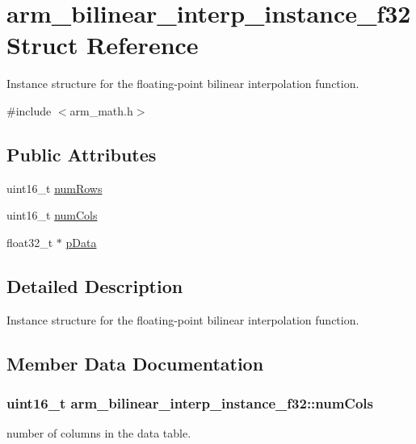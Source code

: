 \hypertarget{structarm__bilinear__interp__instance__f32}{}\section{arm\+\_\+bilinear\+\_\+interp\+\_\+instance\+\_\+f32 Struct Reference}
\label{structarm__bilinear__interp__instance__f32}


Instance structure for the floating-\/point bilinear interpolation function.  




{\ttfamily \#include $<$arm\+\_\+math.\+h$>$}

\subsection*{Public Attributes}
\begin{DoxyCompactItemize}
\item 
uint16\+\_\+t \hyperlink{structarm__bilinear__interp__instance__f32_a34f2b17cc57b95011960df9718af6ed6}{num\+Rows}
\item 
uint16\+\_\+t \hyperlink{structarm__bilinear__interp__instance__f32_aede17bebfb1f835b61d71dd813eab3f8}{num\+Cols}
\item 
float32\+\_\+t $\ast$ \hyperlink{structarm__bilinear__interp__instance__f32_afd1e764591c991c212d56c893efb5ea4}{p\+Data}
\end{DoxyCompactItemize}


\subsection{Detailed Description}
Instance structure for the floating-\/point bilinear interpolation function. 

\subsection{Member Data Documentation}
\subsubsection[{\texorpdfstring{num\+Cols}{numCols}}]{\setlength{\rightskip}{0pt plus 5cm}uint16\+\_\+t arm\+\_\+bilinear\+\_\+interp\+\_\+instance\+\_\+f32\+::num\+Cols}\hypertarget{structarm__bilinear__interp__instance__f32_aede17bebfb1f835b61d71dd813eab3f8}{}\label{structarm__bilinear__interp__instance__f32_aede17bebfb1f835b61d71dd813eab3f8}
number of columns in the data table. 
